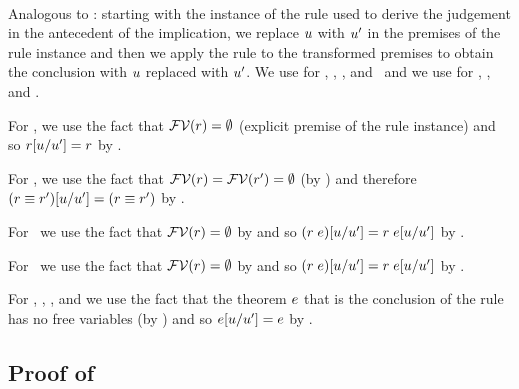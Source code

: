 \begin{bycase}
\Case{\restrules}\\
Analogous to \Rtbool: starting with the instance of the rule used to derive
the judgement in the antecedent of the implication, we replace $u$ with
$u'$ in the premises of the rule instance and then we apply the rule to
the transformed premises to obtain the conclusion with $u$ replaced with
$u'$. We use  for \Rtvar, \Rtinst, \Rtedef, and
\Reop\ and we use  for \Reif, \Rthifsbs, and \Rthif.

For \Rtsub, we use the fact that $\mathcal{FV}(r)=\emptyset$ (explicit premise
of the rule instance) and so $r[u/u']=r$ by
.


For \Rterestr, we use the fact that
$\mathcal{FV}(r)=\mathcal{FV}(r')=\emptyset$ (by
) and therefore
$(r\equiv r')[u/u']=(r\equiv r')$ by
.

For \Resub\ we use the fact that $\mathcal{FV}(r)=\emptyset$ by
 and so
$(r\;e)[u/u']=r\;e[u/u']$ by
.

For \Rthsub\ we use the fact that $\mathcal{FV}(r)=\emptyset$ by
 and so
$(r\;e)[u/u']=r\;e[u/u']$ by
.

For \Rthbool, \Rthext, \Rthrec,
and \Rthprojsub
we use the fact that the theorem $e$ that is the conclusion of the rule
has no free variables (by ) and so
$e[u/u']=e$ by .

\end{bycase}



\subsection*{Proof of }

